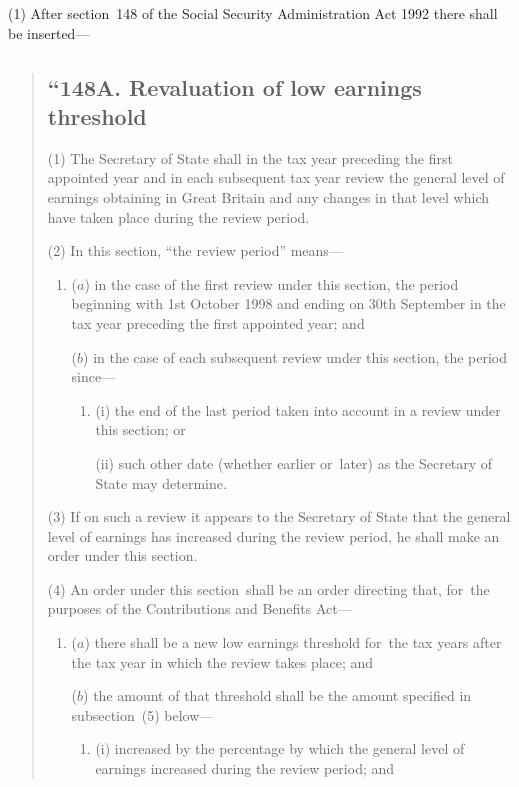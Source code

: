 \documentclass[12pt,a4paper]{article}
\begin{document}
(1) After section~148 of the Social Security Administration Act 1992 there shall be inserted—
\begin{quotation}
\subsection*{“148A. Revaluation of low earnings threshold}

(1) The Secretary of State shall in the tax year preceding the first appointed year and in each subsequent tax year review the general level of earnings obtaining in Great Britain and any changes in that level which have taken place during the review period.

(2) In this section, “the review period” means—
\begin{enumerate}\item[]
($a$) in the case of the first review under this section, the period beginning with 1st October 1998 and ending on 30th September in the tax year preceding the first appointed year; and

($b$) in the case of each subsequent review under this section, the period since—
\begin{enumerate}\item[]
(i) the end of the last period taken into account in a review under this section; or

(ii) such other date (whether earlier or~later) as the Secretary of State may determine.
\end{enumerate}
\end{enumerate}

(3) If on such a review it appears to the Secretary of State that the general level of earnings has increased during the review period, he shall make an order under this section.

(4) An order under this section~shall be an order directing that, for~the purposes of the Contributions and Benefits Act—
\begin{enumerate}\item[]
($a$) there shall be a new low earnings threshold for~the tax years after the tax year in which the review takes place; and

($b$) the amount of that threshold shall be the amount specified in subsection~(5)  below—
\begin{enumerate}\item[]
(i) increased by the percentage by which the general level of earnings increased during the review period; and


\end{enumerate}
\end{enumerate}
\end{quotation}
\end{document}
